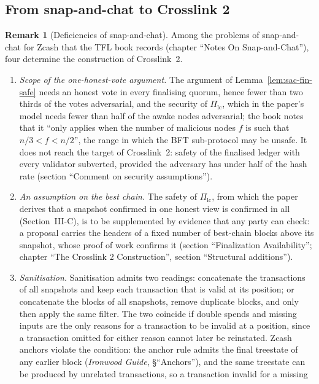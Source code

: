 \documentclass[11pt,a4paper]{article}
\theoremstyle{definition}
\newtheorem{remark}[theorem]{Remark}
\newcommand{\Pilc}{\Pi_{\mathrm{lc}}}
\begin{document}
\subsection{From snap-and-chat to Crosslink 2}\label{sec:model-amend}

\begin{remark}[Deficiencies of snap-and-chat]\label{rem:sac-deficiencies}
Among the problems of snap-and-chat for Zcash that the TFL book records
(chapter ``Notes On Snap-and-Chat''), four determine the construction of
Crosslink~2.
\begin{enumerate}[label=(\arabic*)]
\item \emph{Scope of the one-honest-vote argument.} The argument of
  Lemma~\ref{lem:sac-fin-safe} needs an honest vote in every finalising
  quorum, hence fewer than two thirds of the votes adversarial, and the
  security of $\Pilc$, which in the paper's model needs fewer than half of
  the awake nodes adversarial; the book notes that it ``only applies when the
  number of malicious nodes $f$ is such that $n/3 < f < n/2$'', the range in
  which the BFT sub-protocol may be unsafe. It does not reach the target of
  Crosslink~2: safety of the finalised ledger with every validator
  subverted, provided the adversary has under half of the hash rate (section
  ``Comment on security assumptions'').
\item \emph{An assumption on the best chain.} The safety of $\Pilc$, from
  which the paper derives that a snapshot confirmed in one honest view is
  confirmed in all (Section~III-C), is to be supplemented by
  evidence that any party can check: a proposal carries the headers of a
  fixed number of best-chain blocks above its snapshot, whose proof of work
  confirms it (section ``Finalization Availability''; chapter ``The
  Crosslink 2 Construction'', section ``Structural additions'').
\item \emph{Sanitisation.} Sanitisation admits two readings: concatenate the
  transactions of all snapshots and keep each transaction that is valid at
  its position; or concatenate the blocks of all snapshots, remove duplicate
  blocks, and only then apply the same filter. The two coincide if double
  spends and missing inputs are the only reasons for a transaction to be
  invalid at a position, since a transaction omitted for either reason
  cannot later be reinstated. Zcash anchors violate the condition: the
  anchor rule admits the final treestate of any earlier block
  (\emph{Ironwood Guide}, \S``Anchors''), and the same treestate can be
  produced by unrelated transactions, so a transaction invalid for a missing

\end{enumerate}
\end{remark}
\end{document}

